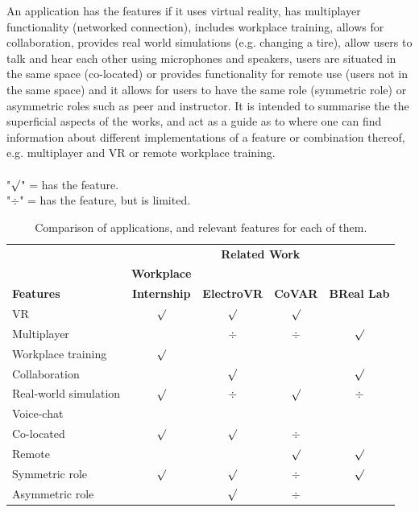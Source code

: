 An application has the features if it uses virtual reality, has multiplayer functionality (networked connection), includes workplace training, allows for collaboration, provides real world simulations (e.g. changing a tire), allow users to talk and hear each other using microphones and speakers, users are situated in the same space (co-located) or provides functionality for remote use (users not in the same space) and it allows for users to have the same role (symmetric role) or asymmetric roles such as peer and instructor.         
It is intended to summarise the the superficial aspects of the works, and act as a guide as to where one can find information about different implementations of a feature or combination thereof, e.g. multiplayer and VR or remote workplace training.  
\\
\newcommand*\ON[0]{$\surd$}
\newcommand*\LIM[0]{$\div$}
\\ "\ON" = has the feature.
\\ "\LIM" = has the feature, but is limited.

\begin{table}[!ht]
    \begin{center}
    \begin{tabular}{@{}l c c c c @{}}
           & \multicolumn{4}{c}{\textbf{Related Work}}
    \\  \cmidrule{2-5}
           & \textbf{Workplace}
    \\       
             \textbf{Features}
           & \textbf{Internship}
           & \textbf{ElectroVR}
           & \textbf{CoVAR}
           & \textbf{BReal Lab}
    \\ \midrule
       VR                           & \ON & \ON  & \ON  & 
    \\ Multiplayer                  &     & \LIM & \LIM & \ON
    \\ Workplace training           & \ON &      &      & 
    \\ Collaboration                &     & \ON  &      & \ON
    \\ Real-world simulation        & \ON & \LIM & \ON  & \LIM
    \\ Voice-chat                   &     &      &      & 
    \\ Co-located                   & \ON & \ON  & \LIM &  
    \\ Remote                       &     &      & \ON  & \ON    
    \\ Symmetric role               & \ON & \ON  & \LIM & \ON  
    \\ Asymmetric role              &     & \ON  & \LIM  &
    \\ \bottomrule
    \end{tabular}
    \captionsetup{width=1\linewidth}
    \caption{Comparison of applications, and relevant features for each of them.}
    \label{table:comparisonRelatedWork}
    \end{center}
\end{table}







\cleardoublepage